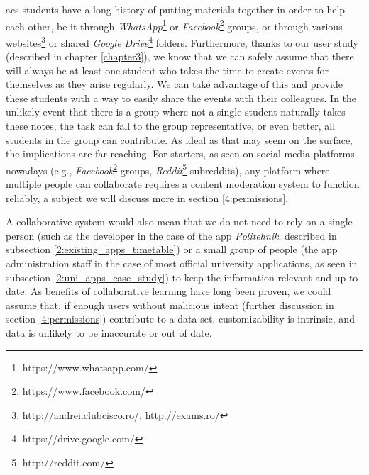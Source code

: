     \acrshort{acs} students have a long history of putting materials together in order to help each other, be it through \textit{WhatsApp}\footnote{https://www.whatsapp.com/} or \textit{Facebook}\footnote{\label{2:note:facebook}https://www.facebook.com/} groups, or through various websites\footnote{http://andrei.clubcisco.ro/, http://exams.ro/} or shared \textit{Google Drive}\footnote{https://drive.google.com/} folders. Furthermore, thanks to our user study (described in chapter \ref{chapter3}), we know that we can safely assume that there will always be at least one student who takes the time to create events for themselves as they arise regularly. We can take advantage of this and provide these students with a way to easily share the events with their colleagues. In the unlikely event that there is a group where not a single student naturally takes these notes, the task can fall to the group representative, or even better, all students in the group can contribute. As ideal as that may seem on the surface, the implications are far-reaching. For starters, as seen on social media platforms nowadays (e.g., \textit{Facebook}\textsuperscript{\ref{2:note:facebook}} groups, \textit{Reddit}\footnote{http://reddit.com/} subreddits), any platform where multiple people can collaborate requires a content moderation system\cite{roberts2019behind} to function reliably, a subject we will discuss more in section \ref{4:permissions}.
    
    A collaborative system would also mean that we do not need to rely on a single person (such as the developer in the case of the app \textit{Politehnik}, described in subsection \ref{2:existing_apps_timetable}) or a small group of people (the app administration staff in the case of most official university applications, as seen in subsection \ref{2:uni_apps_case_study}) to keep the information relevant and up to date. As benefits of collaborative learning have long been proven\cite{klemm1997benefits}, we could assume that, if enough users without malicious intent (further discussion in section \ref{4:permissions}) contribute to a data set, customizability is intrinsic, and data is unlikely to be inaccurate or out of date.
    
    
